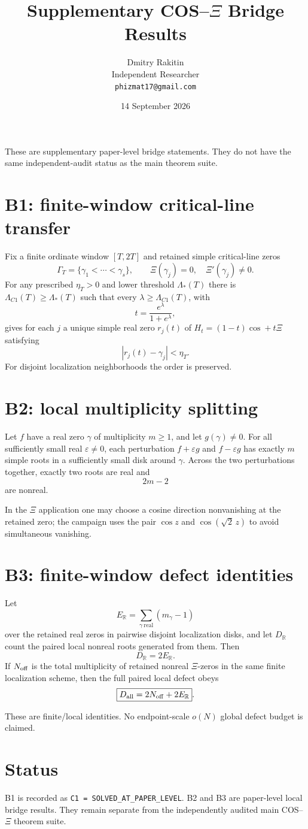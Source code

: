 \documentclass[11pt]{article}
\title{Supplementary COS--$\Xi$ Bridge Results}
\author{Dmitry Rakitin\\Independent Researcher\\\texttt{phizmat17@gmail.com}}
\date{14 September 2026}
\begin{document}
\maketitle

These are supplementary paper-level bridge statements. They do not have the same independent-audit
status as the main theorem suite.

\section*{B1: finite-window critical-line transfer}
Fix a finite ordinate window $[T,2T]$ and retained simple critical-line zeros
\[
\Gamma_T=\{\gamma_1<\cdots<\gamma_s\},\qquad
\Xi(\gamma_j)=0,\quad \Xi'(\gamma_j)\ne0.
\]
For any prescribed $\eta_T>0$ and lower threshold $\Lambda_*(T)$ there is
$\Lambda_{C1}(T)\ge\Lambda_*(T)$ such that every
$\lambda\ge\Lambda_{C1}(T)$, with
\[
t=\frac{e^\lambda}{1+e^\lambda},
\]
gives for each $j$ a unique simple real zero $r_j(t)$ of
$H_t=(1-t)\cos+t\Xi$ satisfying
\[
|r_j(t)-\gamma_j|<\eta_T.
\]
For disjoint localization neighborhoods the order is preserved.

\section*{B2: local multiplicity splitting}
Let $f$ have a real zero $\gamma$ of multiplicity $m\ge1$, and let $g(\gamma)\ne0$.
For all sufficiently small real $\varepsilon\ne0$, each perturbation
$f+\varepsilon g$ and $f-\varepsilon g$ has exactly $m$ simple roots in a sufficiently
small disk around $\gamma$. Across the two perturbations together, exactly two roots are real and
\[
\boxed{2m-2}
\]
are nonreal.

In the $\Xi$ application one may choose a cosine direction nonvanishing at the retained zero;
the campaign uses the pair $\cos z$ and $\cos(\sqrt2\,z)$ to avoid simultaneous vanishing.

\section*{B3: finite-window defect identities}
Let
\[
E_{\mathbb R}=\sum_{\gamma\ \mathrm{real}}(m_\gamma-1)
\]
over the retained real zeros in pairwise disjoint localization disks, and let
$D_{\mathbb R}$ count the paired local nonreal roots generated from them. Then
\[
\boxed{D_{\mathbb R}=2E_{\mathbb R}}.
\]
If $N_{\rm off}$ is the total multiplicity of retained nonreal $\Xi$-zeros in the same
finite localization scheme, then the full paired local defect obeys
\[
\boxed{D_{\rm all}=2N_{\rm off}+2E_{\mathbb R}}.
\]

These are finite/local identities. No endpoint-scale $o(N)$ global defect budget is claimed.

\section*{Status}
B1 is recorded as \texttt{C1 = SOLVED\_AT\_PAPER\_LEVEL}. B2 and B3 are paper-level
local bridge results. They remain separate from the independently audited main COS--$\Xi$ theorem suite.
\end{document}
